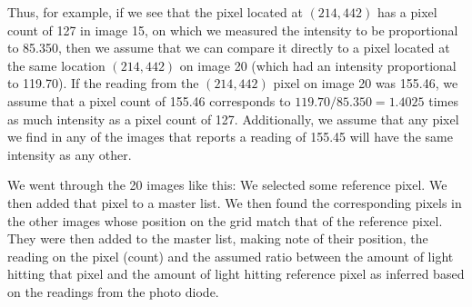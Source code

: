 Thus, for example, if we see that the pixel located at $(214,442)$ has a pixel count of 127 in image 15, on which we measured the intensity to be proportional to 85.350, then we assume that we can compare it directly to a pixel located at the same location $(214,442)$ on image 20 (which had an intensity proportional to 119.70). If the reading from the $(214,442)$ pixel on image 20 was 155.46, we assume that a pixel count of 155.46 corresponds to $119.70/85.350=1.4025$ times as much intensity as a pixel count of 127. Additionally, we assume that any pixel we find in any of the images that reports a reading of 155.45 will have the same intensity as any other. 


We went through the 20 images like this: We selected some reference pixel. We then added that pixel to a master list. We then found the corresponding pixels in the other images whose position on the grid match that of the reference pixel. They were then added to the master list, making note of their position, the reading on the pixel (count) and the assumed ratio between the amount of light hitting that pixel and the amount of light hitting reference pixel as inferred based on the readings from the photo diode.

